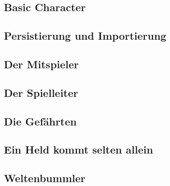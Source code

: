\subsection{Basic Character}\label{subsec:base_character}


\subsection{Persistierung und Importierung}\label{subsec:database_and_import}


\subsection{Der Mitspieler}\label{subsec:the_player}


\subsection{Der Spielleiter}\label{subsec:gamemaster}


\subsection{Die Gefährten}\label{subsec:npcs}


\subsection{Ein Held kommt selten allein}\label{subsec:connecting_friends}


\subsection{Weltenbummler}\label{subsec:its_a_whole_new_world}
